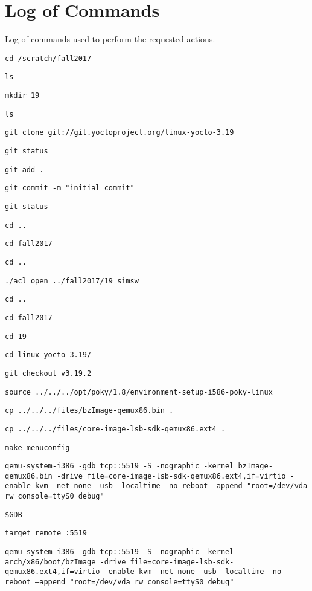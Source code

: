 \documentclass[10pt,letterpaper,draftclsnofoot,onecolumn]{IEEEtran}
\begin{document}
\section{Log of Commands}
\noindent Log of commands used to perform the requested actions\cite{kernel}.
\begin{description}
\item \texttt{cd /scratch/fall2017}
\item \texttt{ls}
\item \texttt{mkdir 19}
\item \texttt{ls}
\item \texttt{git clone git://git.yoctoproject.org/linux-yocto-3.19}
\item \texttt{git status}
\item \texttt{git add .}
\item \texttt{git commit -m "initial commit"}
\item \texttt{git status}
\item \texttt{cd ..}
\item \texttt{cd fall2017}
\item \texttt{cd ..}
\item \texttt{./acl\_open ../fall2017/19 simsw}
\item \texttt{cd ..}
\item \texttt{cd fall2017}
\item \texttt{cd 19}
\item \texttt{cd linux-yocto-3.19/}
\item \texttt{git checkout v3.19.2}
\item \texttt{source ../../../opt/poky/1.8/environment-setup-i586-poky-linux }
\item \texttt{cp ../../../files/bzImage-qemux86.bin .}
\item \texttt{cp ../../../files/core-image-lsb-sdk-qemux86.ext4 .}
\item \texttt{make menuconfig}
\item \texttt{qemu-system-i386 -gdb tcp::5519 -S -nographic -kernel bzImage-qemux86.bin -drive file=core-image-lsb-sdk-qemux86.ext4,if=virtio -enable-kvm -net none -usb -localtime --no-reboot --append "root=/dev/vda rw console=ttyS0 debug"}
\item \texttt{\$GDB}
\item \texttt{target remote :5519}
\item \texttt{qemu-system-i386 -gdb tcp::5519 -S -nographic -kernel arch/x86/boot/bzImage -drive file=core-image-lsb-sdk-qemux86.ext4,if=virtio -enable-kvm -net none -usb -localtime --no-reboot --append "root=/dev/vda rw console=ttyS0 debug"}
\end{description}
\end{document}

